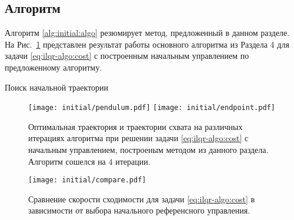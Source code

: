 \documentclass[../../doc.tex]{subfiles}
\begin{document}
    \subsection{Алгоритм}

    Алгоритм \ref{alg:initial:algo} резюмирует метод, предложенный в данном разделе.
    На Рис.~\ref{fig:initial:pendulum} представлен результат работы основного алгоритма из Раздела 4 для задачи \eqref{eq:ilqr-algo:cost} с построенным начальным управлением по предложенному алгоритму.


    \begin{rusalgorithm}\caption{Поиск начальной траектории}\label{alg:initial:algo}
        \DontPrintSemicolon
        
    \end{rusalgorithm}

    \begin{figure}[h]
        \begin{center}
            \texttt{[image: initial/pendulum.pdf]}
            \texttt{[image: initial/endpoint.pdf]}
        \end{center}
        \caption{
            Оптимальная траектория и траектории схвата на различных итерациях алгоритма при решении задачи \eqref{eq:ilqr-algo:cost} с начальным управлением, построеным методом из данного раздела.
            Алгоритм сошелся на $4$ итерации.
        }
        \label{fig:initial:pendulum}
    \end{figure}
    \begin{figure}[h]
        \begin{center}
            \texttt{[image: initial/compare.pdf]}
        \end{center}
        \caption{Сравнение скорости сходимости для задачи \eqref{eq:ilqr-algo:cost} в зависимости от выбора начального референсного управления.}
        \label{fig:compare-init}
    \end{figure}

    \ifSubfilesClassLoaded{
        \nocite{*}
        \clearpage
        
        
    }{}
\end{document}
